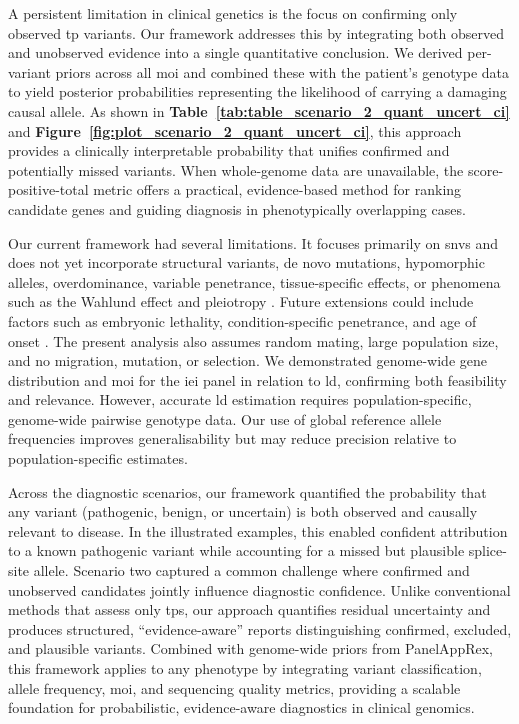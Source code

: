 A persistent limitation in clinical genetics is the focus on confirming only observed \ac{tp} variants. Our framework addresses this by integrating both observed and unobserved evidence into a single quantitative conclusion. We derived per-variant priors across all \ac{moi} and combined these with the patient's genotype data to yield posterior probabilities representing the likelihood of carrying a damaging causal allele. As shown in \textbf{Table~\ref{tab:table_scenario_2_quant_uncert_ci}} and \textbf{Figure~\ref{fig:plot_scenario_2_quant_uncert_ci}}, this approach provides a clinically interpretable probability that unifies confirmed and potentially missed variants. When whole-genome data are unavailable, the score-positive-total metric offers a practical, evidence-based method for ranking candidate genes and guiding diagnosis in phenotypically overlapping cases.

Our current framework had several limitations. It focuses primarily on \ac{snv}s and does not yet incorporate structural variants, de novo mutations, hypomorphic alleles, overdominance, variable penetrance, tissue-specific effects, or phenomena such as the Wahlund effect and pleiotropy \cite{zschocke_mendelian_2023}. Future extensions could include factors such as embryonic lethality, condition-specific penetrance, and age of onset \cite{hannah_using_2024}. The present analysis also assumes random mating, large population size, and no migration, mutation, or selection.  
We demonstrated genome-wide gene distribution and \ac{moi} for the \ac{iei} panel in relation to \ac{ld}, confirming both feasibility and relevance. However, accurate \ac{ld} estimation requires population-specific, genome-wide pairwise genotype data. Our use of global reference allele frequencies improves generalisability but may reduce precision relative to population-specific estimates.

Across the diagnostic scenarios, our framework quantified the probability that any variant (pathogenic, benign, or uncertain) is both observed and causally relevant to disease. In the illustrated examples, this enabled confident attribution to a known pathogenic variant while accounting for a missed but plausible splice-site allele. Scenario two captured a common challenge where confirmed and unobserved candidates jointly influence diagnostic confidence. Unlike conventional methods that assess only \ac{tp}s, our approach quantifies residual uncertainty and produces structured, ``evidence-aware'' reports distinguishing confirmed, excluded, and plausible variants.  
Combined with genome-wide priors from PanelAppRex, this framework applies to any phenotype by integrating variant classification, allele frequency, \ac{moi}, and sequencing quality metrics, providing a scalable foundation for probabilistic, evidence-aware diagnostics in clinical genomics.

